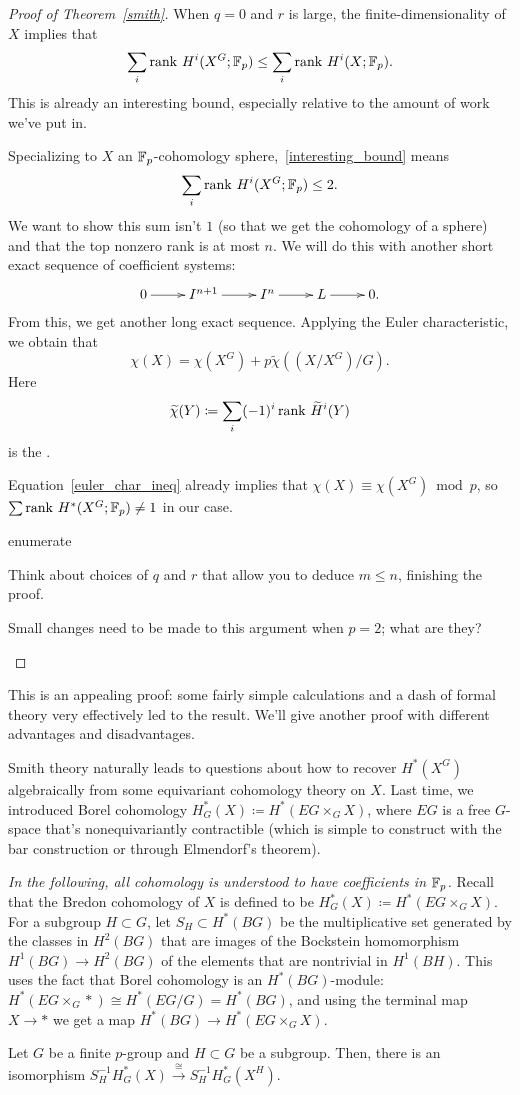 \begin{proof}[Proof of Theorem~\ref{smith}]
When $q = 0$ and $r$ is large, the finite-dimensionality of $X$ implies that
\begin{equation}
\label{interesting_bound}
\sum_i\operatorname{rank\,} H^i(X^G;\mathbb F_p) \le \sum_i \operatorname{rank\,} H^i(X;\mathbb F_p).
\end{equation}
This is already an interesting bound, especially relative to the amount of work we've put in.

Specializing to $X$ an $\mathbb F_p$-cohomology sphere,~\eqref{interesting_bound} means
\[\sum_i \operatorname{rank\,} H^i(X^G;\mathbb F_p) \le 2.\]
We want to show this sum isn't $1$ (so that we get the cohomology of a sphere) and that the top nonzero rank is at
most $n$. We will do this with another short exact sequence of coefficient systems:
\[\shortexact{I^{n+1}}{I^n}{L}.\]
From this, we get another long exact sequence. Applying the Euler characteristic, we obtain that
\begin{equation}
\label{euler_char_ineq}
\chi(X) = \chi(X^G) + p\widetilde\chi((X/X^G)/G).
\end{equation}
Here
\[\widetilde\chi(Y)\coloneqq \sum_i (-1)^i\operatorname{rank\,} \widetilde H^i(Y)\]
is the .

Equation~\ref{euler_char_ineq} already implies that $\chi(X) \equiv \chi(X^G)\bmod p$, so $\sum\operatorname{rank\,}
H^*(X^G;\mathbb F_p)\ne 1$ in our case.
\begin{comp}{ex}{enumerate}
	\item Think about choices of $q$ and $r$ that allow you to deduce $m\le n$, finishing the proof.
	\item Small changes need to be made to this argument when $p = 2$; what are they?\qedhere
\end{comp}
\end{proof}
This is an appealing proof: some fairly simple calculations and a dash of formal theory very effectively led to the
result. We'll give another proof with different advantages and disadvantages.

Smith theory naturally leads to questions about how to recover $H^*(X^G)$ algebraically from some equivariant
cohomology theory on $X$. Last time, we introduced Borel cohomology $H_G^*(X) \coloneqq H^*(EG\times_G X)$, where
$EG$ is a free $G$-space that's nonequivariantly contractible (which is simple to construct with the bar
construction or through Elmendorf's theorem).

\emph{In the following, all cohomology is understood to have coefficients in $\mathbb F_p$.} Recall that the Bredon
cohomology of $X$ is defined to be $H_G^*(X)\coloneqq H^*(EG\times_G X)$. For a subgroup $H\subset G$, let
$S_H\subset H^*(BG)$ be the multiplicative set generated by the classes in $H^2(BG)$ that are images of the
Bockstein homomorphism $H^1(BG)\to H^2(BG)$ of the elements that are nontrivial in $H^1(BH)$. This uses the fact
that Borel cohomology is an $H^*(BG)$-module: $H^*(EG\times_G *) \cong H^*(EG/G) = H^*(BG)$, and using the terminal
map $X\to *$ we get a map $H^*(BG)\to H^*(EG\times_G X)$.
\begin{thm}
\label{localization}
Let $G$ be a finite $p$-group and $H\subset G$ be a subgroup. Then, there is an isomorphism
$S_H^{-1}H_G^*(X)\stackrel\cong\to S_H^{-1}H_G^*(X^H)$.
\end{thm}

